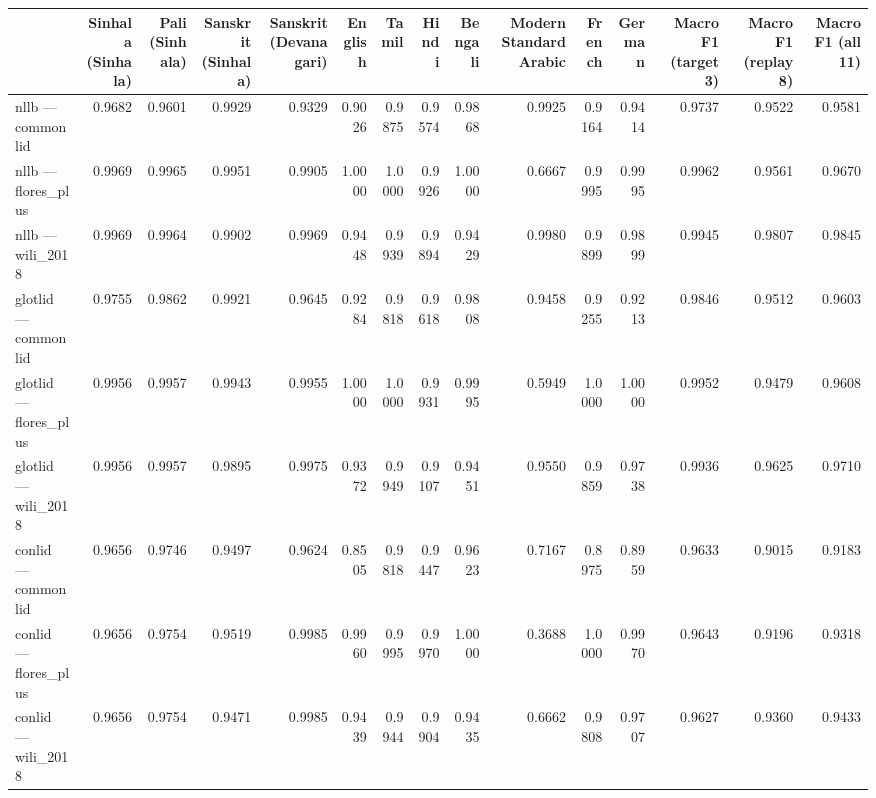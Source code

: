 \begin{tabular}{lrrrrrrrrrrrrrr}
\toprule
 & Sinhala (Sinhala) & Pali (Sinhala) & Sanskrit (Sinhala) & Sanskrit (Devanagari) & English & Tamil & Hindi & Bengali & Modern Standard Arabic & French & German & Macro F1 (target 3) & Macro F1 (replay 8) & Macro F1 (all 11) \\
\midrule
nllb — commonlid & 0.9682 & 0.9601 & 0.9929 & 0.9329 & 0.9026 & 0.9875 & 0.9574 & 0.9868 & 0.9925 & 0.9164 & 0.9414 & 0.9737 & 0.9522 & 0.9581 \\
nllb — flores\_plus & 0.9969 & 0.9965 & 0.9951 & 0.9905 & 1.0000 & 1.0000 & 0.9926 & 1.0000 & 0.6667 & 0.9995 & 0.9995 & 0.9962 & 0.9561 & 0.9670 \\
nllb — wili\_2018 & 0.9969 & 0.9964 & 0.9902 & 0.9969 & 0.9448 & 0.9939 & 0.9894 & 0.9429 & 0.9980 & 0.9899 & 0.9899 & 0.9945 & 0.9807 & 0.9845 \\
glotlid — commonlid & 0.9755 & 0.9862 & 0.9921 & 0.9645 & 0.9284 & 0.9818 & 0.9618 & 0.9808 & 0.9458 & 0.9255 & 0.9213 & 0.9846 & 0.9512 & 0.9603 \\
glotlid — flores\_plus & 0.9956 & 0.9957 & 0.9943 & 0.9955 & 1.0000 & 1.0000 & 0.9931 & 0.9995 & 0.5949 & 1.0000 & 1.0000 & 0.9952 & 0.9479 & 0.9608 \\
glotlid — wili\_2018 & 0.9956 & 0.9957 & 0.9895 & 0.9975 & 0.9372 & 0.9949 & 0.9107 & 0.9451 & 0.9550 & 0.9859 & 0.9738 & 0.9936 & 0.9625 & 0.9710 \\
conlid — commonlid & 0.9656 & 0.9746 & 0.9497 & 0.9624 & 0.8505 & 0.9818 & 0.9447 & 0.9623 & 0.7167 & 0.8975 & 0.8959 & 0.9633 & 0.9015 & 0.9183 \\
conlid — flores\_plus & 0.9656 & 0.9754 & 0.9519 & 0.9985 & 0.9960 & 0.9995 & 0.9970 & 1.0000 & 0.3688 & 1.0000 & 0.9970 & 0.9643 & 0.9196 & 0.9318 \\
conlid — wili\_2018 & 0.9656 & 0.9754 & 0.9471 & 0.9985 & 0.9439 & 0.9944 & 0.9904 & 0.9435 & 0.6662 & 0.9808 & 0.9707 & 0.9627 & 0.9360 & 0.9433 \\
\bottomrule
\end{tabular}
